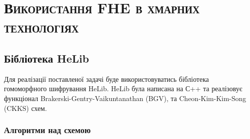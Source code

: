 \newpage

\chapter{\textsc{Використання FHE в хмарних технологіях}}

\section{Бібліотека HeLib}
Для реалізації поставленої задачі буде використовуватись бібліотека гомоморфного шифрування
HeLib. HeLib була написана на С++ та реалізовує функціонал  Brakerski-Gentry-Vaikuntanathan 
(BGV), та Cheon-Kim-Kim-Song (CKKS) схем.

\subsection{Алгоритми над схемою}
